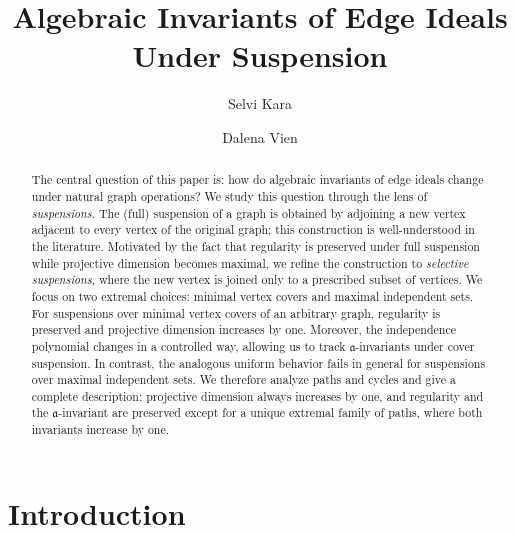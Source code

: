\documentclass[12pt]{amsart}
\theoremstyle{plain}
\theoremstyle{definition}
\begin{document}
\title{Algebraic Invariants of Edge Ideals Under Suspension}

\author[Kara]{Selvi Kara}
\address[S.~Kara]{Department of Mathematics, Bryn Mawr College, Bryn Mawr, PA 19010}

\author[Vien]{Dalena Vien}
\address[D.~Vien]{Department of Mathematics, Bryn Mawr College, Bryn Mawr, PA 19010}


\begin{abstract}
The central question of this paper is: how do algebraic invariants of edge ideals change under natural graph operations?
We study this question through the lens of \emph{suspensions}.
The (full) suspension of a graph is obtained by adjoining a new vertex adjacent to every vertex of the original graph; this construction is well-understood in the literature. Motivated by the fact that regularity is preserved under full suspension while projective dimension becomes maximal, we refine the construction to \emph{selective suspensions}, where the new vertex is joined only to a prescribed subset of vertices. We focus on two extremal choices: minimal vertex covers and maximal independent sets.
For suspensions over minimal vertex covers of an arbitrary graph, regularity is preserved and projective dimension increases by one.
Moreover, the independence polynomial changes in a controlled way, allowing us to track $\mathfrak a$-invariants under cover suspension.
In contrast, the analogous uniform behavior fails in general for suspensions over maximal independent sets.
We therefore analyze paths and cycles and give a complete description: projective dimension always increases by one, and regularity and the $\mathfrak a$-invariant are preserved except for a unique extremal family of paths, where both invariants increase by one.
\end{abstract}



\maketitle

\section{Introduction}
\end{document}
